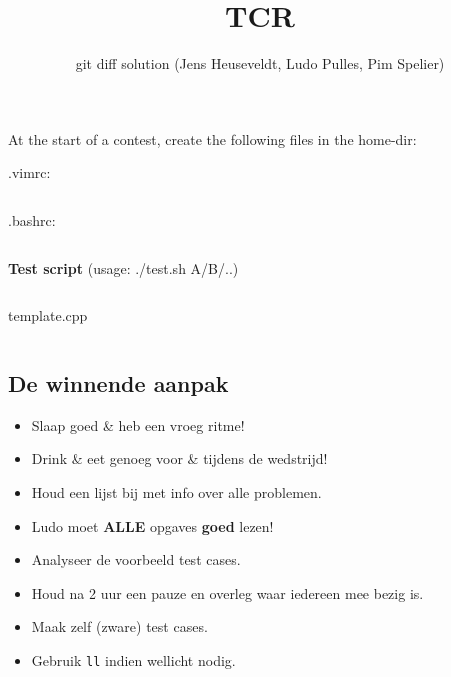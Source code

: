 \documentclass[8pt,a4paper,landscape,oneside]{amsart}
\title{TCR}
\subtitle{git diff solution (Jens Heuseveldt, Ludo Pulles, Pim Spelier)}
\newcommand{\mintedstyle}[2]{\inputminted[fontsize=\normalsize,baselinestretch=.9,breaklines,tabsize=2]{#1}{code/#2}}
\newcommand{\code}[1]{\mintedstyle{cpp}{#1}}
\begin{document}
\begin{multicols*}{3}
\maketitle
\begin{comment}
\begin{center}
	\makeatletter
	\textbf{\@title} \\
	\emph{\@author}
	\makeatother
\end{center}
\end{comment}


\tableofcontents

\begin{center}
At the start of a contest, create the following files in the home-dir:
\end{center}

.vimrc: \mintedstyle{vim}{.vimrc}
.bashrc: \mintedstyle{bash}{.bashrc}
\textbf{Test script} (usage: ./test.sh A/B/..)
\mintedstyle{bash}{test.sh}

\begin{center}
template.cpp
\end{center}

\code{T.cpp}

\subsection{De winnende aanpak}

\begin{itemize}
	\setlength\itemsep{-.25em}
	\item Slaap goed \& heb een vroeg ritme!
	\item Drink \& eet genoeg voor \& tijdens de wedstrijd!
	\item Houd een lijst bij met info over alle problemen.
	\item Ludo moet {\huge\textbf{ALLE}} opgaves \textbf{goed} lezen!
	\item Analyseer de voorbeeld test cases.
	\item Houd na 2 uur een pauze en overleg waar iedereen mee bezig is.
	\item Maak zelf (zware) test cases.
	\item Gebruik \texttt{ll} indien wellicht nodig.
\end{itemize}


\end{multicols*}
\end{document}
